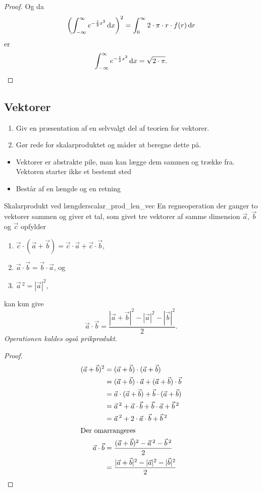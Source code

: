 \documentclass{article}
\begin{document}
\begin{proof}
	Og da 
	\[
		\left(\int_{-\infty}^\infty e^{-\frac{1}{2}x^2} \,\mathrm{d} x\right)^2 = \int_0^\infty 2 \cdot \pi \cdot r \cdot f(r) \,\mathrm{d} r
	\] 
	er 
	\[
		\int_{-\infty}^\infty e^{-\frac{1}{2}x^2} \,\mathrm{d} x = \sqrt{2 \cdot \pi}.\qedhere
	\] 
\end{proof}

\begin{tcolorbox}
	\section{Vektorer}
	\tcblower
	\begin{enumerate}
		\item Giv en præsentation af en selvvalgt del af teorien for vektorer.
		\item Gør rede for skalarproduktet og måder at beregne dette på.
	\end{enumerate}
\end{tcolorbox}

\begin{itemize}
	\item Vektorer er abstrakte pile, man kan lægge dem sammen og trække fra.
		Vektoren starter ikke et bestemt sted
	\item Består af en længde og en retning
\end{itemize}
\begin{theorem}{Skalarprodukt ved længder}{scalar_prod_len_vec}
	En regneoperation der ganger to vektorer sammen og giver et tal, som givet
	tre vektorer af samme dimension $\vec{a}$, $\vec{b}$ og $\vec{c}$ opfylder
	\begin{enumerate}
		\item $\vec{c} \cdot (\vec{a} + \vec{b}) = \vec{c} \cdot \vec{a} + \vec{c} \cdot \vec{b}$,
		\item $\vec{a} \cdot \vec{b} = \vec{b} \cdot \vec{a}$, og
		\item $\vec{a}\,^2 = |\vec{a}|^2$,
	\end{enumerate}
	kan kun give
	\[
		\vec{a} \cdot \vec{b} = \frac{|\vec{a} + \vec{b}|^2 - |\vec{a}|^2 - |\vec{b}|^2}{2}.
	\] 
	\textit{Operationen kaldes også prikprodukt}.
\end{theorem}
\begin{proof}
\begin{align*}
	(\vec{a} + \vec{b})^2 &= (\vec{a} + \vec{b}) \cdot (\vec{a} + \vec{b})\\
						  &= (\vec{a} + \vec{b}) \cdot \vec{a} + (\vec{a} + \vec{b}) \cdot \vec{b}\\
						  &= \vec{a} \cdot (\vec{a} + \vec{b}) + \vec{b} \cdot (\vec{a} + \vec{b})\\
						  &= \vec{a}\,^2 + \vec{a} \cdot \vec{b} + \vec{b} \cdot \vec{a} + \vec{b}\,^2\\
						  &= \vec{a}\,^2 + 2 \cdot \vec{a} \cdot \vec{b} + \vec{b}\,^2\\
						  \intertext{Der omarrangeres}
	\vec{a} \cdot \vec{b} &= \frac{(\vec{a} + \vec{b})^2 - \vec{a}\,^2 - \vec{b}\,^2}{2}\\
						  &= \frac{|\vec{a} + \vec{b}|^2 - |\vec{a}|^2 - |\vec{b}|^2}{2}\qedhere
\end{align*}
\end{proof}
\end{document}
